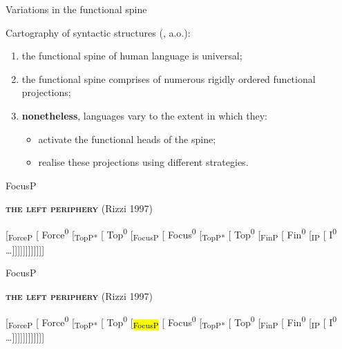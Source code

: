 \documentclass[lesson_slides]{subfiles}
\begin{document}
\begin{frame}[c]{Variations in the functional spine}

    \noindent Cartography of syntactic structures (\cite{cinquerizzi2010,rizzicinque2016}, a.o.): \pause
    \begin{enumerate}
        \item the functional spine of human language is universal; \pause
        \item the functional spine comprises of numerous rigidly ordered functional projections; \pause
        \item \textbf{nonetheless}, languages vary to the extent in which they: \pause
            \begin{itemize}
                \item[\ding{227}] activate the functional heads of the spine; \pause
                \item[\ding{227}] realise these projections using different strategies. 
            \end{itemize}
    \end{enumerate}

\end{frame}
    \begin{frame}[c]{FocusP}
    
    \textbf{\textsc{the left periphery}} (Rizzi 1997)
    
    [\textsubscript{ForceP} [ Force\textsuperscript{0} [\textsubscript{TopP*} [ Top\textsuperscript{0} [\textsubscript{FocusP} [ Focus\textsuperscript{0} [\textsubscript{TopP*} [ Top\textsuperscript{0} [\textsubscript{FinP} [ Fin\textsuperscript{0} [\textsubscript{IP} [ I\textsuperscript{0} \dots ]]]]]]]]]]]]
      
    \end{frame}
\begin{frame}[c]{FocusP}

\textbf{\textsc{the left periphery}} (Rizzi 1997)

[\textsubscript{ForceP} [ Force\textsuperscript{0} [\textsubscript{TopP*} [ Top\textsuperscript{0} [\textsubscript{\hl{FocusP}} [ Focus\textsuperscript{0} [\textsubscript{TopP*} [ Top\textsuperscript{0} [\textsubscript{FinP} [ Fin\textsuperscript{0} [\textsubscript{IP} [ I\textsuperscript{0} \dots ]]]]]]]]]]]]


  
\end{frame}
\end{document}
